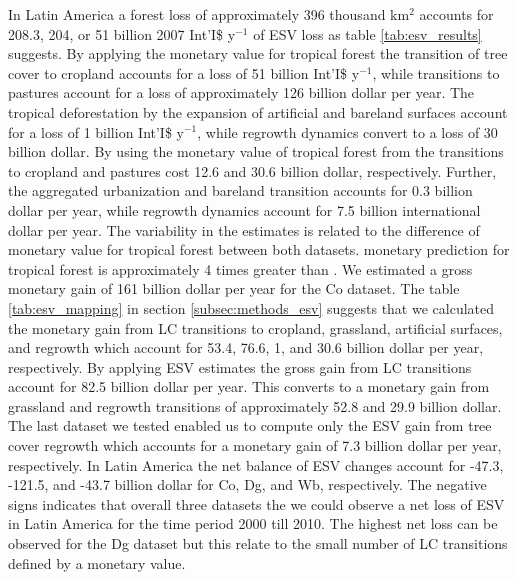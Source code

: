 		In Latin America a forest loss of approximately 396 thousand km$^2$ accounts for 208.3, 204, or 51 billion 2007 Int'I\$ y$^{-1}$ of \ac{ESV} loss as table \ref{tab:esv_results} suggests. By applying the \citet{Costanza2014} monetary value for tropical forest the transition of tree cover to cropland accounts for a loss of 51 billion Int'I\$ y$^{-1}$, while transitions to pastures account for a loss of approximately 126 billion dollar per year. The tropical deforestation by the expansion of artificial and bareland surfaces account for a loss of 1 billion Int'I\$ y$^{-1}$, while regrowth dynamics convert to a loss of 30 billion dollar. By using the monetary value of tropical forest from \citet{Siikamaki2015} the transitions to cropland and pastures cost 12.6 and 30.6 billion dollar, respectively. Further, the aggregated urbanization and bareland transition accounts for 0.3 billion dollar per year, while regrowth dynamics account for 7.5 billion international dollar per year. The variability in the estimates is related to the difference of monetary value for tropical forest between both datasets. \citeauthor{Costanza2014} monetary prediction for tropical forest is approximately 4 times greater than \citeauthor{Siikamaki2015}. We estimated a gross monetary gain of 161 billion dollar per year for the Co dataset. The table \ref{tab:esv_mapping} in section \ref{subsec:methods_esv} suggests that we calculated the monetary gain from \ac{LC} transitions to cropland, grassland, artificial surfaces, and regrowth which account for 53.4, 76.6, 1, and 30.6 billion dollar per year, respectively. By applying \citet{Groot2012} \ac{ESV} estimates the gross gain from \ac{LC} transitions account for 82.5 billion dollar per year. This converts to a monetary gain from grassland and regrowth transitions of approximately 52.8 and 29.9 billion dollar. The last dataset we tested enabled us to compute only the \ac{ESV} gain from tree cover regrowth which accounts for a monetary gain of 7.3 billion dollar per year, respectively. In Latin America the net balance of \ac{ESV} changes account for -47.3, -121.5, and -43.7 billion dollar for Co, Dg, and Wb, respectively. The negative signs indicates that overall three datasets the we could observe a net loss of \ac{ESV} in Latin America for the time period 2000 till 2010. The highest net loss can be observed for the Dg dataset but this relate to the small number of \ac{LC} transitions defined by a monetary value.
